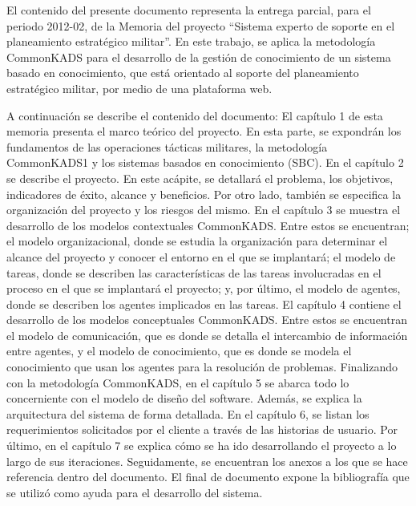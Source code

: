 El contenido del presente documento representa la entrega parcial, para el periodo 2012-02, de la Memoria del proyecto “Sistema experto de soporte en el planeamiento estratégico militar”. En este trabajo, se aplica la metodología CommonKADS para el desarrollo de la gestión de conocimiento de un sistema basado en conocimiento, que está orientado al soporte del planeamiento estratégico militar, por medio de una plataforma web.

A continuación se describe el contenido del documento:
El capítulo 1 de esta memoria presenta el marco teórico del proyecto. En esta parte, se expondrán los fundamentos de las operaciones tácticas militares, la metodología CommonKADS1 y los sistemas basados en conocimiento (SBC).
En el capítulo 2 se describe el proyecto. En este acápite, se detallará el problema, los objetivos, indicadores de éxito, alcance y beneficios. Por otro lado, también se especifica la organización del proyecto y los riesgos del mismo.
En el capítulo 3 se muestra el desarrollo de los modelos contextuales CommonKADS. Entre estos se encuentran; el modelo organizacional, donde se estudia la organización para determinar el alcance del proyecto y conocer el entorno en el que se implantará; el modelo de tareas, donde se describen las características de las tareas involucradas en el proceso en el que se implantará el proyecto; y, por último, el modelo de agentes, donde se describen los agentes implicados en las tareas. 
El capítulo 4 contiene el desarrollo de los modelos conceptuales CommonKADS. Entre estos se encuentran el modelo de comunicación, que es donde se detalla el intercambio de información entre agentes, y el modelo de conocimiento, que es donde se modela el conocimiento que usan los agentes para la resolución de problemas.
Finalizando con la metodología CommonKADS, en el capítulo 5 se abarca todo lo concerniente con el modelo de diseño del software. Además, se explica la arquitectura del sistema de forma detallada.
En el capítulo 6, se listan los requerimientos solicitados por el cliente a través de las historias de usuario.
Por último, en el capítulo  7 se explica cómo se ha ido desarrollando el proyecto a lo largo de sus iteraciones.
Seguidamente, se encuentran los anexos a los que se hace referencia dentro del documento. 
El final de documento expone la bibliografía que se utilizó como ayuda para el desarrollo del sistema.
